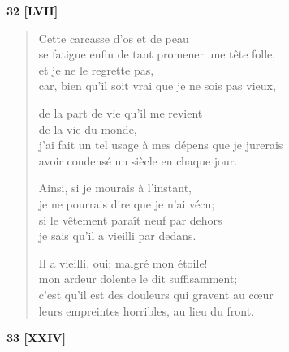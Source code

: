 \bigskip

\begin{center}
  \textbf{32 [LVII]}
\end{center}

\begin{verse}
  Cette carcasse d'os et de peau \\
  se fatigue enfin de tant promener une tête folle, \\
  et je ne le regrette pas, \\
  car, bien qu'il soit vrai que je ne sois pas vieux,

  de la part de vie qu'il me revient \\
  de la vie du monde, \\
  j'ai fait un tel usage à mes dépens que je jurerais \\
  avoir condensé un siècle en chaque jour.

  Ainsi, si je mourais à l'instant, \\
  je ne pourrais dire que je n'ai vécu; \\
  si le vêtement paraît neuf par dehors \\
  je sais qu'il a vieilli par dedans.

  Il a vieilli, oui; malgré mon étoile! \\
  mon ardeur dolente le dit suffisamment; \\
  c'est qu'il est des douleurs qui gravent au cœur \\
  leurs empreintes horribles, au lieu du front.
\end{verse}

\pagebreak

\begin{center}
  \textbf{33 [XXIV]}
\end{center}

